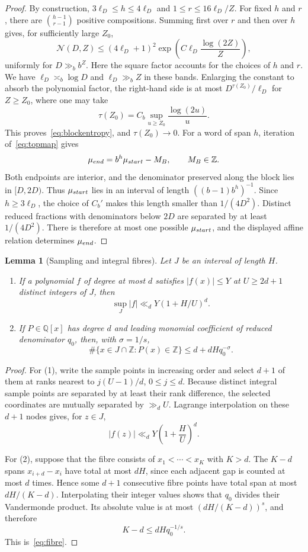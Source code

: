 \documentclass[10pt,a4paper]{amsart}
\newtheorem{lemma}[theorem]{Lemma}
\newcommand{\Q}{\mathbb Q}
\newcommand{\Z}{\mathbb Z}
\begin{document}
\begin{proof}
By construction, $3\ell_D\le h\le4\ell_D$ and
$1\le r\le16\ell_D/Z$. For fixed $h$ and $r$, there are
$\binom{h-1}{r-1}$ positive compositions. Summing first over $r$ and then over
$h$ gives, for sufficiently large $Z_0$,
\[
 \mathcal N(D,Z)
 \le (4\ell_D+1)^2
 \exp\!\left(C\ell_D\frac{\log(2Z)}Z\right),
\]
uniformly for $D\gg_b b^Z$. Here the square factor accounts for the choices of
$h$ and $r$. We have $\ell_D\asymp_b\log D$ and $\ell_D\gg_b Z$ in these
bands. Enlarging the constant to absorb the polynomial factor, the right-hand
side is at most $D^{\tau(Z_0)}/\ell_D$ for $Z\ge Z_0$, where one may take
\[
 \tau(Z_0)=C_b\sup_{u\ge Z_0}\frac{\log(2u)}u.
\]
This proves~\eqref{eq:blockentropy}, and $\tau(Z_0)\to0$.
For a word of span $h$, iteration of~\eqref{eq:topmap} gives
\[
 \mu_{\rm end}=b^h\mu_{\rm start}-M_B,\qquad M_B\in\Z.
\]
Both endpoints are interior, and the denominator preserved along the block
lies in $[D,2D)$. Thus $\mu_{\rm start}$ lies in an interval of length
$((b-1)b^h)^{-1}$. Since $h\ge3\ell_D$, the choice of $C_b'$ makes this length
smaller than $1/(4D^2)$. Distinct reduced fractions with denominators below
$2D$ are separated by at least $1/(4D^2)$. There is therefore at most one
possible $\mu_{\rm start}$, and the displayed affine relation determines
$\mu_{\rm end}$.
\end{proof}

\begin{lemma}[Sampling and integral fibres]\label{lem:sampling}
Let $J$ be an interval of length $H$.
\begin{enumerate}
\item If a polynomial $f$ of degree at most $d$ satisfies $|f(x)|\le Y$ at
$U\ge2d+1$ distinct integers of $J$, then
\[
 \sup_J|f|\ll_d Y(1+H/U)^d.
\]
\item If $P\in\Q[x]$ has degree $d$ and leading monomial coefficient of
reduced denominator $q_0$, then, with $\sigma=1/s$,
\begin{equation}\label{eq:fibre}
 \#\{x\in J\cap\Z:P(x)\in\Z\}\le d+dHq_0^{-\sigma}.
\end{equation}
\end{enumerate}
\end{lemma}

\begin{proof}
For (1), write the sample points in increasing order and select $d+1$ of them
at ranks nearest to $j(U-1)/d$, $0\le j\le d$. Because distinct integral
sample points are separated by at least their rank difference, the selected
coordinates are mutually separated by $\gg_d U$. Lagrange interpolation on
these $d+1$ nodes gives, for $z\in J$,
\[
 |f(z)|\ll_d Y\left(1+\frac HU\right)^d.
\]

For (2), suppose that the fibre consists of
$x_1<\cdots<x_K$ with $K>d$. The $K-d$ spans
$x_{i+d}-x_i$ have total at most $dH$, since each adjacent gap is counted at
most $d$ times. Hence some $d+1$ consecutive fibre points have total span at
most $dH/(K-d)$. Interpolating their integer values shows that $q_0$ divides
their Vandermonde product. Its absolute value is at most
$(dH/(K-d))^s$, and therefore
\[
 K-d\le dHq_0^{-1/s}.
\]
This is~\eqref{eq:fibre}.
\end{proof}
\end{document}
